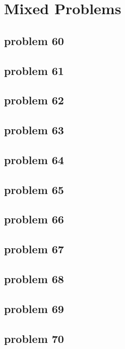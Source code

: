 \section{Mixed Problems}

\subsection{problem 60}


\subsection{problem 61}


\subsection{problem 62}


\subsection{problem 63}


\subsection{problem 64}


\subsection{problem 65}


\subsection{problem 66}


\subsection{problem 67}


\subsection{problem 68}


\subsection{problem 69}


\subsection{problem 70}

